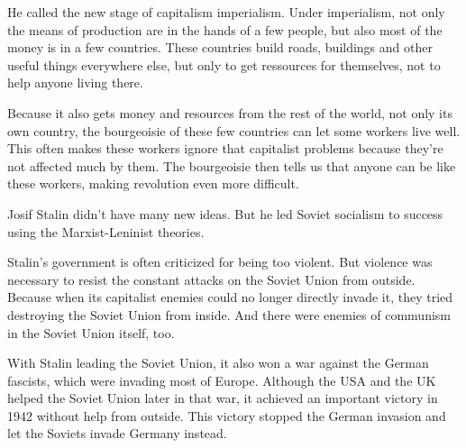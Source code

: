 \documentclass[a4paper]{book} %
\begin{document}
He called the new stage of capitalism imperialism. Under imperialism, not only the means of production are in the hands of a few people, but also most of the money is in a few countries. These countries build roads, buildings and other useful things everywhere else, but only to get ressources for themselves, not to help anyone living there.

Because it also gets money and resources from the rest of the world, not only its own country, the bourgeoisie of these few countries can let some workers live well. This often makes these workers ignore that capitalist problems because they're not affected much by them. The bourgeoisie then tells us that anyone can be like these workers, making revolution even more difficult.

Josif Stalin didn't have many new ideas. But he led Soviet socialism to success using the Marxist-Leninist theories.

Stalin's government is often criticized for being too violent. But violence was necessary to resist the constant attacks on the Soviet Union from outside. Because when its capitalist enemies could no longer directly invade it, they tried destroying the Soviet Union from inside. And there were enemies of communism in the Soviet Union itself, too.

With Stalin leading the Soviet Union, it also won a war against the German fascists, which were invading most of Europe. Although the USA and the UK helped the Soviet Union later in that war, it achieved an important victory in 1942 without help from outside. This victory stopped the German invasion and let the Soviets invade Germany instead.
\end{document}
